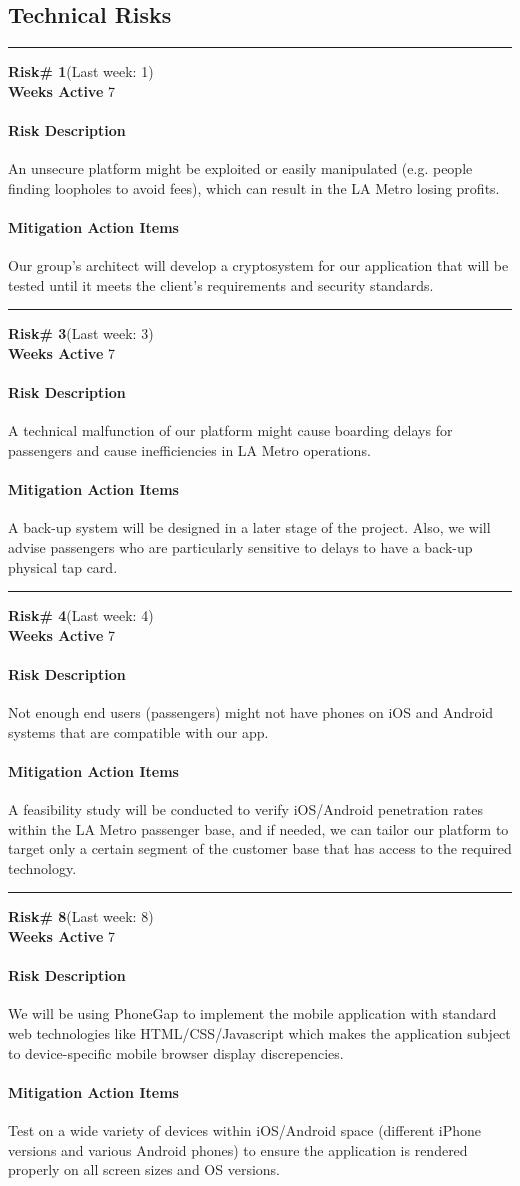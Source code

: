 \newcommand{\risk}[5]{
	\rule{\textwidth}{.1pt}
	\textbf{ Risk\# #1}(Last week: #2)\\
	\textbf{Weeks Active} #3
	\paragraph{Risk Description} #4
	\paragraph{Mitigation Action Items} #5\\
}



\subsection{Technical Risks}

\risk{1}{1}{7}{
An unsecure platform might be exploited or easily manipulated (e.g. people finding loopholes to avoid fees), which can result in the LA Metro losing profits.
}{
Our group’s architect will develop a cryptosystem for our application that will be tested until it meets the client’s requirements and security standards.
}
\risk{3}{3}{7}{
A technical malfunction of our platform might cause boarding delays for passengers and cause inefficiencies in LA Metro operations.
}{
A back-up system will be designed in a later stage of the project. Also, we will advise passengers who are particularly sensitive to delays to have a back-up physical tap card.
}
\risk{4}{4}{7}{
Not enough end users (passengers) might not have phones on iOS and Android systems that are compatible with our app.
}{
A feasibility study will be conducted to verify iOS/Android penetration rates within the LA Metro passenger base, and if needed, we can tailor our platform to target only a certain segment of the customer base that has access to the required technology.
}
\risk{8}{8}{7}{
We will be using PhoneGap to implement the mobile application with standard web technologies like HTML/CSS/Javascript which makes the application subject to device-specific mobile browser display discrepencies.
}{
Test on a wide variety of devices within iOS/Android space (different iPhone versions and various Android phones) to ensure the application is rendered properly on all screen sizes and OS versions.
}

